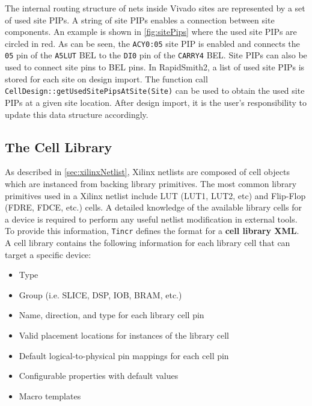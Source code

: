 The internal routing structure of nets inside Vivado sites are represented by
a set of used site PIPs. A string of site PIPs enables a connection between site
components. An example is shown in \autoref{fig:sitePips} where the used site
PIPs are circled in red. As can be seen, the \texttt{ACY0:05} site PIP is
enabled and connects the \texttt{05} pin of the \texttt{A5LUT} BEL to the
\texttt{DI0} pin of the \texttt{CARRY4} BEL. Site PIPs can also be used to 
connect site pins to BEL pins. In RapidSmith2, a list of used site PIPs is
stored for each site on design import. The function call
\texttt{CellDesign::getUsedSitePipsAtSite(Site)} can be used to obtain the used
site PIPs at a given site location. After design import, it is the user's
responsibility to update this data structure accordingly.

\subsection{The Cell Library} \label{sec:cellLibraryinDesignSection}
As described in \autoref{sec:xilinxNetlist}, Xilinx netlists are composed of
cell objects which are instanced from backing library primitives. The most
common library primitives used in a Xilinx netlist include LUT (LUT1,
LUT2, etc) and Flip-Flop (FDRE, FDCE, etc.) cells. A detailed knowledge of the
available library cells for a device is required to perform any useful netlist
modification in external tools. To provide this information, \texttt{Tincr}
defines the format for a \textbf{cell library XML}. A cell library contains the
following information for each library cell that can target a specific device:

\begin {itemize}
  \item Type
  \item Group (i.e. SLICE, DSP, IOB, BRAM, etc.) 
  \item Name, direction, and type for each library cell pin
  \item Valid placement locations for instances of the library cell
  \item Default logical-to-physical pin mappings for each cell pin
  \item Configurable properties with default values
  \item Macro templates 
\end{itemize}


